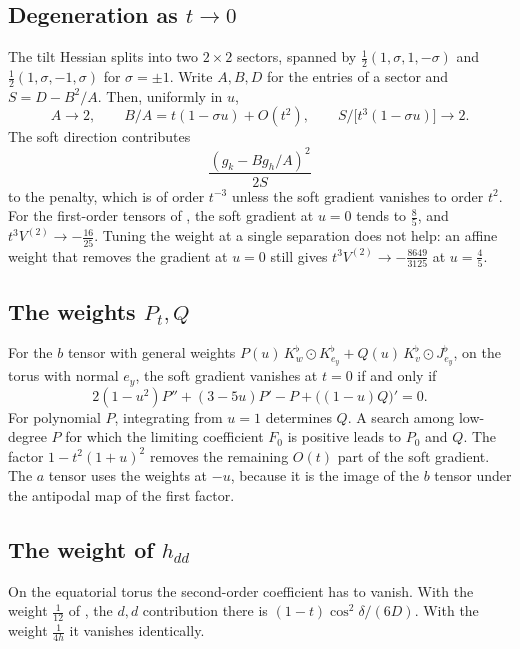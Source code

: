 \documentclass[11pt]{amsart}
\theoremstyle{definition}
\theoremstyle{remark}
\newcommand{\sym}{\odot}
\newcommand{\fl}{^{\flat}}
\begin{document}
\subsection{Degeneration as \texorpdfstring{$t\to0$}{t to 0}}
The tilt Hessian splits into two $2\times2$ sectors, spanned by $\frac12(1,\sigma,1,-\sigma)$ and $\frac12(1,\sigma,-1,\sigma)$ for $\sigma=\pm1$. Write $A,B,D$ for the entries of a sector and $S=D-B^2/A$. Then, uniformly in $u$,
\[ A\to2,\qquad B/A=t(1-\sigma u)+O(t^2),\qquad S/\big[t^3(1-\sigma u)\big]\to2 . \]
The soft direction contributes
\[ \frac{(g_k-Bg_h/A)^2}{2S} \]
to the penalty, which is of order $t^{-3}$ unless the soft gradient vanishes to order $t^2$. For the first-order tensors of \cite{BH}, the soft gradient at $u=0$ tends to $\frac85$, and $t^3V^{(2)}\to-\frac{16}{25}$. Tuning the weight at a single separation does not help: an affine weight that removes the gradient at $u=0$ still gives $t^3V^{(2)}\to-\frac{8649}{3125}$ at $u=\frac45$.

\subsection{The weights \texorpdfstring{$P_t,Q$}{P, Q}}
For the $b$ tensor with general weights $P(u)\,K\fl_{w}\sym K\fl_{e_y}+Q(u)\,K\fl_{v}\sym J\fl_{e_y}$, on the torus with normal $e_y$, the soft gradient vanishes at $t=0$ if and only if
\[ 2(1-u^2)P''+(3-5u)P'-P+\big((1-u)Q\big)'=0 . \]
For polynomial $P$, integrating from $u=1$ determines $Q$. A search among low-degree $P$ for which the limiting coefficient $F_0$ is positive leads to $P_0$ and $Q$. The factor $1-t^2(1+u)^2$ removes the remaining $O(t)$ part of the soft gradient. The $a$ tensor uses the weights at $-u$, because it is the image of the $b$ tensor under the antipodal map of the first factor.

\subsection{The weight of \texorpdfstring{$h_{dd}$}{h\_dd}}
On the equatorial torus the second-order coefficient has to vanish. With the weight $\frac1{12}$ of \cite{BH}, the $d,d$ contribution there is $(1-t)\cos^2\delta/(6D)$. With the weight $\frac1{4h}$ it vanishes identically.
\end{document}
